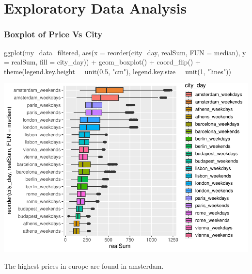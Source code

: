 \documentclass[
]{article}
\newenvironment{Shaded}{\begin{snugshade}}{\end{snugshade}}
\newcommand{\AttributeTok}[1]{\textcolor[rgb]{0.77,0.63,0.00}{#1}}
\newcommand{\DecValTok}[1]{\textcolor[rgb]{0.00,0.00,0.81}{#1}}
\newcommand{\FloatTok}[1]{\textcolor[rgb]{0.00,0.00,0.81}{#1}}
\newcommand{\FunctionTok}[1]{\textcolor[rgb]{0.00,0.00,0.00}{#1}}
\newcommand{\NormalTok}[1]{#1}
\newcommand{\SpecialCharTok}[1]{\textcolor[rgb]{0.00,0.00,0.00}{#1}}
\newcommand{\StringTok}[1]{\textcolor[rgb]{0.31,0.60,0.02}{#1}}
\begin{document}
\hypertarget{exploratory-data-analysis}{%
\section{Exploratory Data Analysis}\label{exploratory-data-analysis}}

\hypertarget{boxplot-of-price-vs-city}{%
\subsubsection{Boxplot of Price Vs
City}\label{boxplot-of-price-vs-city}}

\begin{Shaded}
\begin{Highlighting}[]
\FunctionTok{ggplot}\NormalTok{(my\_data\_filtered, }\FunctionTok{aes}\NormalTok{(}\AttributeTok{x =} \FunctionTok{reorder}\NormalTok{(city\_day, realSum, }\AttributeTok{FUN =}\NormalTok{ median),}
    \AttributeTok{y =}\NormalTok{ realSum, }\AttributeTok{fill =}\NormalTok{ city\_day)) }\SpecialCharTok{+} \FunctionTok{geom\_boxplot}\NormalTok{() }\SpecialCharTok{+} \FunctionTok{coord\_flip}\NormalTok{() }\SpecialCharTok{+}
    \FunctionTok{theme}\NormalTok{(}\AttributeTok{legend.key.height =} \FunctionTok{unit}\NormalTok{(}\FloatTok{0.5}\NormalTok{, }\StringTok{"cm"}\NormalTok{), }\AttributeTok{legend.key.size =} \FunctionTok{unit}\NormalTok{(}\DecValTok{1}\NormalTok{,}
        \StringTok{"lines"}\NormalTok{))}
\end{Highlighting}
\end{Shaded}

\includegraphics{Project_files/figure-latex/unnamed-chunk-5-1.pdf}

The highest prices in europe are found in amsterdam.
\end{document}
